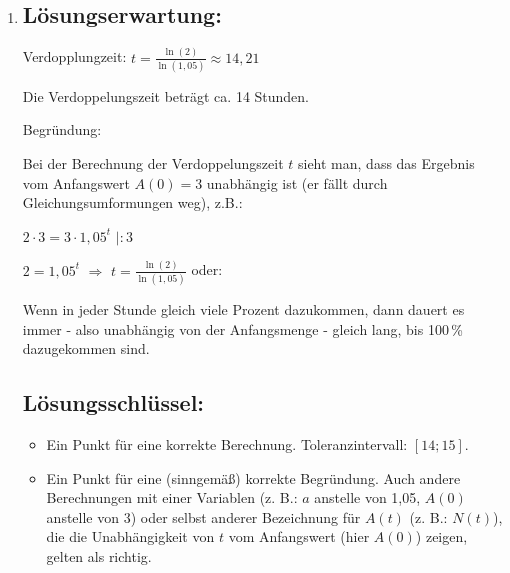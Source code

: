 \begin{langesbeispiel}
{\begin{enumerate}
	Dem vorliegenden exponentiellen Wachstum bzgl. der Fläche der Bakterienkultur wird durch die Größe der Petrischale (ca $2\,376$\,mm$^2$) eine Grenze gesetzt.
 
	 	
	\subsection{Lösungsschlüssel:}
	\begin{itemize}
		\item  Ein Ausgleichspunkt ist nur dann zu geben, wenn für beide Lücken ausschließlich der jeweils richtige Satzteil angekreuzt ist.
		\item  Ein Punkt für eine (sinngemäß) korrekte Beschreibung. Korrekt sind alle Antworten, die erläutern, dass kein unbeschränktes Wachstum innerhalb der Petrischale möglich ist.
	\end{itemize}
	
	\item \subsection{Lösungserwartung:}
		Verdopplungzeit: $t=\frac{\ln(2)}{\ln(1,05)}\approx 14,21$
		
		Die Verdoppelungszeit beträgt ca. 14 Stunden.
		
		Begründung:
		
		Bei der Berechnung der Verdoppelungszeit $t$ sieht man, dass das Ergebnis vom Anfangswert $A(0)=3$ unabhängig ist (er fällt durch Gleichungsumformungen weg), z.B.:
		
		$2\cdot 3=3\cdot 1,05^t$\hspace{1cm} $|:3$
		
		$2=1,05^t$ $\Rightarrow$ $t=\frac{\ln(2)}{\ln(1,05)}$ oder:
		
		Wenn in jeder Stunde gleich viele Prozent dazukommen, dann dauert es immer - also unabhängig von der Anfangsmenge - gleich lang, bis 100\,\% dazugekommen sind.
		
		
	\subsection{Lösungsschlüssel:}
	
\begin{itemize}
	\item Ein Punkt für eine korrekte Berechnung. Toleranzintervall: $[14; 15]$.
	\item  Ein Punkt für eine (sinngemäß) korrekte Begründung. Auch andere Berechnungen mit einer Variablen (z. B.: $a$ anstelle von 1,05, $A(0)$ anstelle von $3$) oder selbst anderer Bezeichnung für $A(t)$ (z. B.: $N(t)$), die die Unabhängigkeit von $t$ vom Anfangswert (hier $A(0)$) zeigen, gelten als richtig. 
\end{itemize}
\end{enumerate}}
		\end{langesbeispiel}